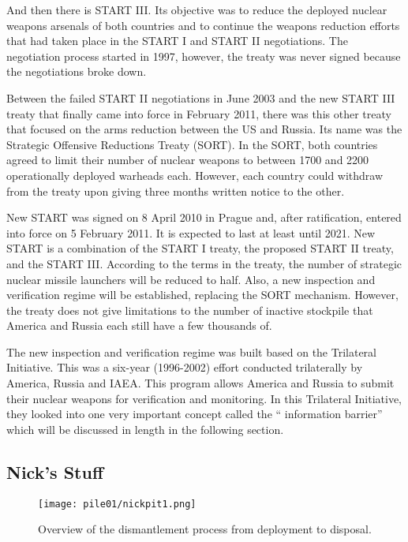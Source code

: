 \documentclass[twoside,titlepage,11pt,twocolumn,a4paper]{article}
\begin{document}
And then there is START III. Its objective was to reduce the deployed nuclear
weapons arsenals of both countries and to continue the weapons reduction
efforts that had taken place in the START I and START II negotiations. 
\citep{startIII} The negotiation process started in 1997, however, the treaty 
was never signed because the negotiations broke down.

Between the failed START II negotiations in June 2003 and the new START III treaty that 
finally came into force in February 2011, there was this other treaty that focused 
on the arms reduction between the US and Russia. Its name was the Strategic 
Offensive Reductions Treaty (SORT). \citep{USRussia} In the SORT, both countries 
agreed to limit their number of nuclear weapons to between 1700 and 2200
operationally deployed warheads each. However, each country could withdraw
from the treaty upon giving three months written notice to the other. 

New START was signed on 8 April 2010 in Prague and, after ratification, 
entered into force on 5 February 2011. It is expected to last at least
until 2021. \citep{USAtoday} New START is a combination of the START I 
treaty, the proposed START II treaty, and the START III. According to 
the terms in the treaty, the number of strategic nuclear missile 
launchers will be reduced to half. Also, a new inspection and 
verification regime will be established, replacing the SORT mechanism. 
However, the treaty does not give limitations to the number of inactive 
stockpile that America and Russia each still have a few thousands of.

The new inspection and verification regime was built based on the 
Trilateral Initiative.  \citep{zarimpas2003} This was a six-year 
(1996-2002) effort conducted trilaterally by America, Russia and IAEA. 
This program allows America and Russia to submit their nuclear weapons 
for verification and monitoring. In this Trilateral Initiative, they 
looked into one very important concept called the “ information barrier” 
which will be discussed in length in the following section. 

\subsection{Nick's Stuff}
\begin{figure*}
  \texttt{[image: pile01/nickpit1.png]}
  \caption{Overview of the dismantlement process from deployment to
    disposal. \citep{IPFN2009}}
\end{figure*}
\end{document}
